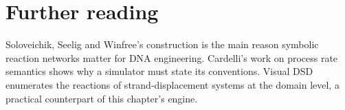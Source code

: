 \section*{Further reading}
Soloveichik, Seelig and Winfree's construction is the main reason symbolic
reaction networks matter for DNA engineering.\cite{Soloveichik2010} Cardelli's
work on process rate semantics shows why a simulator must state its
conventions.\cite{Cardelli2008} Visual DSD enumerates the reactions of
strand-displacement systems at the domain level, a practical counterpart of this
chapter's engine.\cite{Lakin2011}
